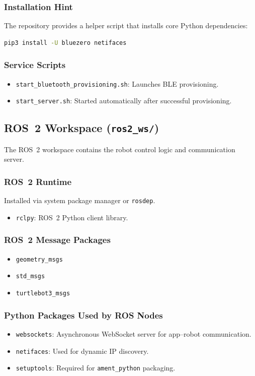 \documentclass[11pt,a4paper]{article}
\begin{document}
\subsubsection{Installation Hint}
The repository provides a helper script that installs core Python dependencies:
\begin{lstlisting}[language=bash]
	pip3 install -U bluezero netifaces
\end{lstlisting}

\subsubsection{Service Scripts}
\begin{itemize}
	\item \texttt{start\_bluetooth\_provisioning.sh}: Launches BLE provisioning.
	\item \texttt{start\_server.sh}: Started automatically after successful provisioning.
\end{itemize}
\newpage
\subsection{ROS~2 Workspace (\texttt{ros2\_ws/})}
The ROS~2 workspace contains the robot control logic and communication server.

\subsubsection{ROS~2 Runtime}
Installed via system package manager or \texttt{rosdep}.
\begin{itemize}
	\item \texttt{rclpy}: ROS~2 Python client library.
\end{itemize}

\subsubsection{ROS~2 Message Packages}
\begin{itemize}
	\item \texttt{geometry\_msgs}
	\item \texttt{std\_msgs}
	\item \texttt{turtlebot3\_msgs}
\end{itemize}

\subsubsection{Python Packages Used by ROS Nodes}
\begin{itemize}
	\item \texttt{websockets}: Asynchronous WebSocket server for app--robot communication.
	\item \texttt{netifaces}: Used for dynamic IP discovery.
	\item \texttt{setuptools}: Required for \texttt{ament\_python} packaging.
\end{itemize}
\end{document}
